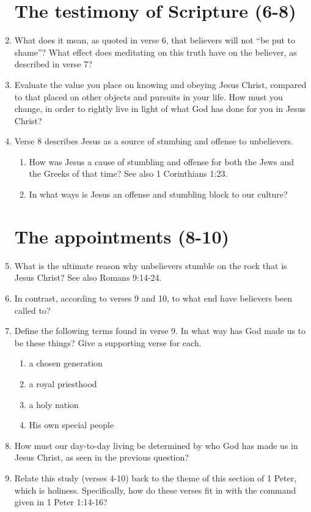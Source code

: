 \documentclass[12pt]{article}
\newcommand{\answerbox}{\vspace{1cm}}
\begin{document}
\begin{enumerate}
\section*{The testimony of Scripture (6-8)}
\item What does it mean, as quoted in verse 6, that 
        believers will not ``be put to shame''?
    What effect does meditating on this truth have on the believer,
        as described in verse 7?
        \answerbox
\item Evaluate the value you place on knowing and obeying Jesus Christ,
        compared to that placed on other objects and pursuits in your life.
    How must you change, in order to rightly live
        in light of what God has done for you in Jesus Christ?
        \answerbox
\item Verse 8 describes Jesus as a source of stumbing and offense
    to unbelievers.
    \begin{enumerate}
    \item How was Jesus a cause of stumbling and offense 
            for both the Jews and the Greeks of that time?
        See also 1 Corinthians 1:23.
        \answerbox
    \item In what ways is Jesus an offense and stumbling block to our culture?
        \answerbox
    \end{enumerate}
\section*{The appointments (8-10)}
\item What is the ultimate reason why unbelievers stumble
        on the rock that is Jesus Christ?
    See also Romans 9:14-24.
        \answerbox
\item In contrast, according to verses 9 and 10, 
        to what end have believers been called to?
        \answerbox
\item Define the following terms found in verse 9.
    In what way has God made us to be these things?
    Give a supporting verse for each.
   \begin{enumerate}
   \item a chosen generation
        \answerbox
   \item a royal priesthood
        \answerbox
   \item a holy nation
        \answerbox
   \item His own special people
        \answerbox
   \end{enumerate}
\item How must our day-to-day living be determined by
        who God has made us in Jesus Christ, 
        as seen in the previous question?
        \answerbox
\item Relate this study (verses 4-10) back to the theme of this section
        of 1 Peter, which is holiness.
    Specifically, how do these verses fit in with the command 
        given in 1 Peter 1:14-16?
        \answerbox
\end{enumerate}
\end{document}
